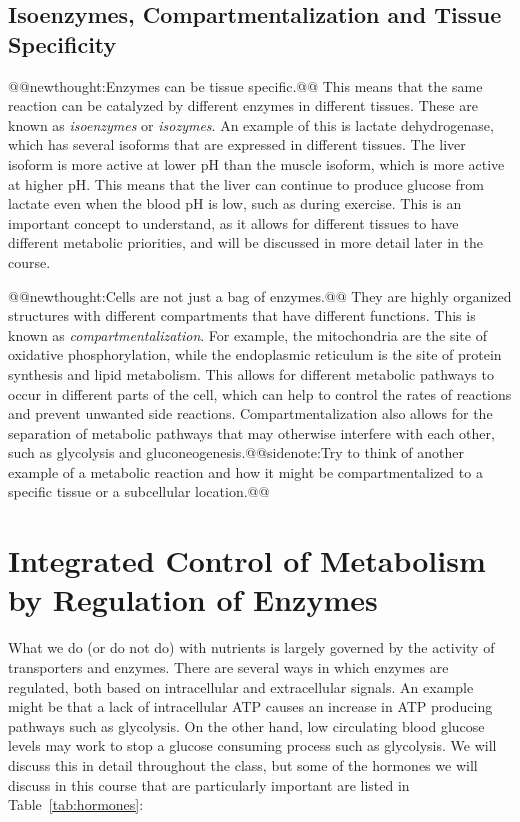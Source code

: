 \documentclass{tufte-handout}
\makeatletter
\def\newthought#1{@@newthought:#1@@}
\def\sidenote#1{@@sidenote:#1@@}
\makeatother
\begin{document}
\subsection{Isoenzymes, Compartmentalization and Tissue Specificity}
\newthought{Enzymes can be tissue specific.}  This means that the same reaction can be catalyzed by different enzymes in different tissues.  These are known as \emph{isoenzymes} or \emph{isozymes}.  An example of this is lactate dehydrogenase, which has several isoforms that are expressed in different tissues.  The liver isoform is more active at lower pH than the muscle isoform, which is more active at higher pH.  This means that the liver can continue to produce glucose from lactate even when the blood pH is low, such as during exercise.  This is an important concept to understand, as it allows for different tissues to have different metabolic priorities, and will be discussed in more detail later in the course.

\newthought{Cells are not just a bag of enzymes.}  They are highly organized structures with different compartments that have different functions.  This is known as \emph{compartmentalization}.  For example, the mitochondria are the site of oxidative phosphorylation, while the endoplasmic reticulum is the site of protein synthesis and lipid metabolism.  This allows for different metabolic pathways to occur in different parts of the cell, which can help to control the rates of reactions and prevent unwanted side reactions.  Compartmentalization also allows for the separation of metabolic pathways that may otherwise interfere with each other, such as glycolysis and gluconeogenesis.\sidenote{Try to think of another example of a metabolic reaction and how it might be compartmentalized to a specific tissue or a subcellular location.}

\section{Integrated Control of Metabolism by Regulation of Enzymes}\label{sec:integrated-control}

What we do (or do not do) with nutrients is largely governed by the activity of transporters and enzymes.  There are several ways in which enzymes are regulated, both based on intracellular and extracellular signals.  An example might be that a lack of intracellular ATP causes an increase in ATP producing pathways such as glycolysis.  On the other hand, low circulating blood glucose levels may work to stop a glucose consuming process such as glycolysis.  We will discuss this in detail throughout the class, but some of the hormones we will discuss in this course that are particularly important are listed in Table~\ref{tab:hormones}:
\end{document}
